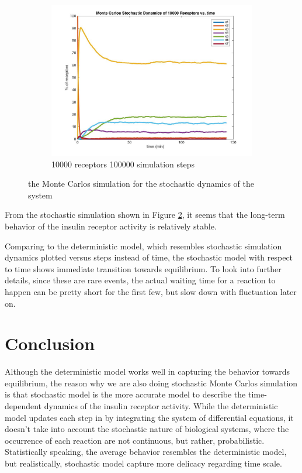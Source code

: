 \documentclass[fleqn,10pt]{wlscirep}
\begin{document}
\begin{figure}
\begin{subfigure}[b]{0.3\textwidth}
        \includegraphics[width=\textwidth]{MC_10000_100000}
        \caption{10000 receptors 100000 simulation steps}
        \label{fig:MC_10000_100000}
    \end{subfigure}
    \caption{the Monte Carlos simulation for the stochastic dynamics of the system}
    \label{fig:MCsim}
\end{figure}

From the stochastic simulation shown in Figure \ref{fig:MCsim}, it seems that the long-term behavior of the insulin receptor activity is relatively stable.

Comparing to the deterministic model, which resembles stochastic simulation dynamics plotted versus steps instead of time, the stochastic model with respect to time shows immediate transition towards equilibrium. To look into further details, since these are rare events, the actual waiting time for a reaction to happen can be pretty short for the first few, but slow down with fluctuation later on.


\section*{Conclusion}

Although the deterministic model works well in capturing the behavior towards equilibrium, the reason why we are also doing stochastic Monte Carlos simulation is that stochastic model is the more accurate model to describe the time-dependent dynamics of the insulin receptor activity. While the deterministic model updates each step in by integrating the system of differential equations, it doesn’t take into account the stochastic nature of biological systems, where the occurrence of each reaction are not continuous, but rather, probabilistic. Statistically speaking, the average behavior resembles the deterministic model, but realistically, stochastic model capture more delicacy regarding time scale.
\end{document}
